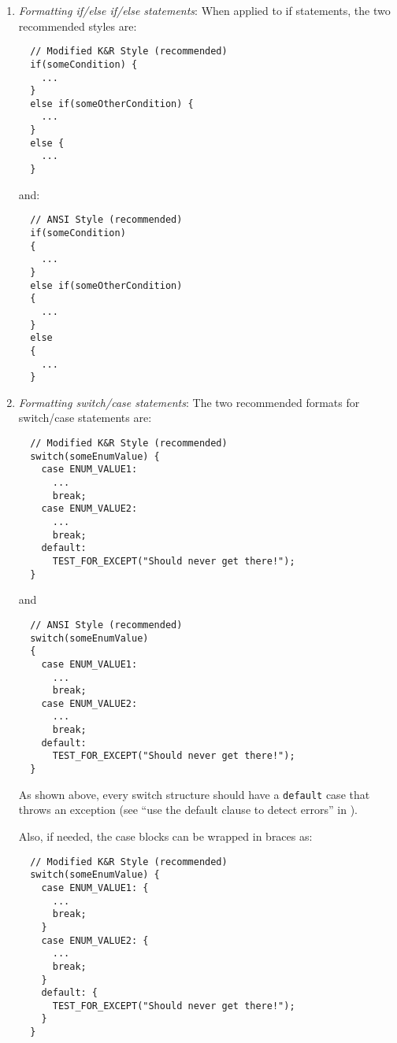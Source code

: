 \begin{enumerate}
  \begin{enumerate}

  {}\item\textit{Formatting if/else if/else
  statements}: When applied to if statements, the two recommended styles are:

  {\small\begin{verbatim}
  // Modified K&R Style (recommended)
  if(someCondition) {
    ...
  }
  else if(someOtherCondition) {
    ...
  }
  else {
    ...
  }
  \end{verbatim}}
  
  {}\noindent{}and:
  
  {\small\begin{verbatim}
  // ANSI Style (recommended)
  if(someCondition)
  {
    ...
  }
  else if(someOtherCondition)
  {
    ...
  }
  else
  {
    ...
  }
  \end{verbatim}}

  {}\item\textit{Formatting switch/case statements}:
  The two recommended formats for switch/case statements are:

  {\small\begin{verbatim}
  // Modified K&R Style (recommended)
  switch(someEnumValue) {
    case ENUM_VALUE1:
      ...
      break;
    case ENUM_VALUE2:
      ...
      break;
    default:
      TEST_FOR_EXCEPT("Should never get there!");
  }
  \end{verbatim}}

  {}\noindent{}and

  {\small\begin{verbatim}
  // ANSI Style (recommended)
  switch(someEnumValue)
  {
    case ENUM_VALUE1:
      ...
      break;
    case ENUM_VALUE2:
      ...
      break;
    default:
      TEST_FOR_EXCEPT("Should never get there!");
  }
  \end{verbatim}}

  As shown above, every switch structure should have a {}\texttt{default} case
  that throws an exception (see ``use the default clause to detect errors''
  in {}\cite[Section 15.1]{CodeComplete2nd04}).

  Also, if needed, the case blocks can be wrapped in braces as:

  {\small\begin{verbatim}
  // Modified K&R Style (recommended)
  switch(someEnumValue) {
    case ENUM_VALUE1: {
      ...
      break;
    }
    case ENUM_VALUE2: {
      ...
      break;
    }    
    default: {
      TEST_FOR_EXCEPT("Should never get there!");
    }
  }
  \end{verbatim}}


\end{enumerate}
\end{enumerate}
